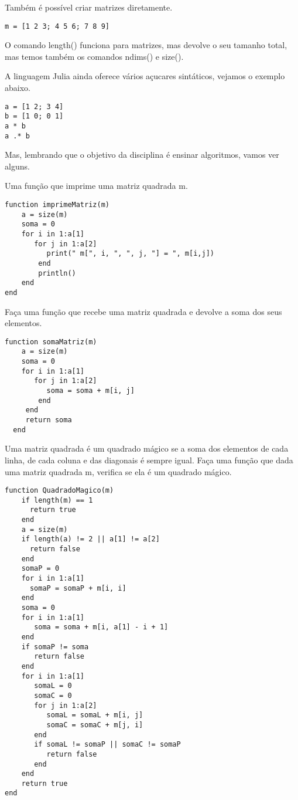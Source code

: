\documentclass[a4paper]{article}
\begin{document}
Também é possível criar matrizes diretamente.

\lstset{language=ein-julia,label= ,caption= ,captionpos=b,numbers=none}
\begin{lstlisting}
m = [1 2 3; 4 5 6; 7 8 9]
\end{lstlisting}

O comando length() funciona para matrizes, mas devolve o seu tamanho
total, mas temos também os comandos ndims() e size().


A linguagem Julia ainda oferece vários açucares sintáticos, vejamos o
exemplo abaixo.
\lstset{language=ein-julia,label= ,caption= ,captionpos=b,numbers=none}
\begin{lstlisting}
a = [1 2; 3 4]
b = [1 0; 0 1]
a * b
a .* b
\end{lstlisting}

Mas, lembrando que o objetivo da disciplina é ensinar algoritmos, vamos
ver alguns.

Uma função que imprime uma matriz quadrada m.

\lstset{language=ein-julia,label= ,caption= ,captionpos=b,numbers=none}
\begin{lstlisting}
function imprimeMatriz(m)
    a = size(m)
    soma = 0
    for i in 1:a[1]
       for j in 1:a[2]
          print(" m[", i, ", ", j, "] = ", m[i,j])
        end
        println()
    end
end
\end{lstlisting}


Faça uma função que recebe uma matriz quadrada e devolve a soma dos seus
elementos.

\lstset{language=ein-julia,label= ,caption= ,captionpos=b,numbers=none}
\begin{lstlisting}
function somaMatriz(m)
    a = size(m)
    soma = 0
    for i in 1:a[1]
       for j in 1:a[2]
          soma = soma + m[i, j]
        end
     end
     return soma
  end
\end{lstlisting}

Uma matriz quadrada é um quadrado mágico se a soma dos elementos de
cada linha, de cada coluna e das diagonais é sempre igual. Faça uma
função que dada uma matriz quadrada m, verifica se ela é um
quadrado mágico.

\lstset{language=ein-julia,label= ,caption= ,captionpos=b,numbers=none}
\begin{lstlisting}
function QuadradoMagico(m)
    if length(m) == 1
      return true
    end
    a = size(m)
    if length(a) != 2 || a[1] != a[2]
      return false
    end
    somaP = 0
    for i in 1:a[1]
      somaP = somaP + m[i, i]
    end
    soma = 0
    for i in 1:a[1]
       soma = soma + m[i, a[1] - i + 1]
    end
    if somaP != soma
       return false
    end
    for i in 1:a[1]
       somaL = 0
       somaC = 0
       for j in 1:a[2]
          somaL = somaL + m[i, j]
          somaC = somaC + m[j, i]
       end
       if somaL != somaP || somaC != somaP
          return false
       end
    end
    return true
end
\end{lstlisting}
\end{document}

